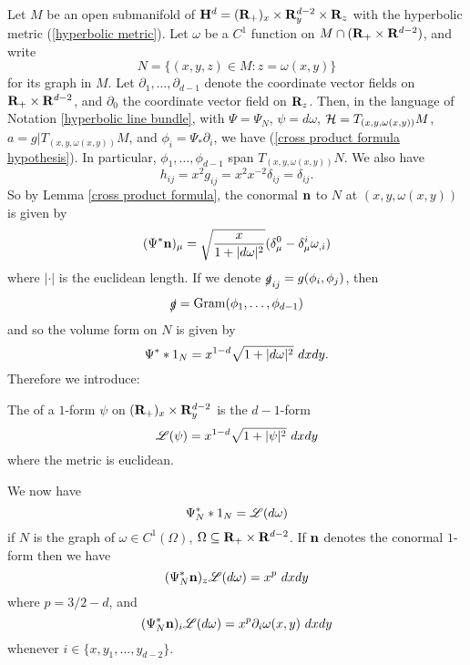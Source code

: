 Let $M$ be an open submanifold of $\mathbf H^d = (\mathbf{R}_+)_x \times \mathbf{R}^{d - 2}_y \times \mathbf{R}_z$ with the hyperbolic metric (\ref{hyperbolic metric}).
Let $\omega$ be a $C^1$ function on $M \cap (\mathbf{R}_+ \times \mathbf{R}^{d - 2})$, and write
$$N = \{(x, y, z) \in M: z = \omega(x, y)\}$$
for its graph in $M$.
Let $\partial_1, \dots, \partial_{d - 1}$ denote the coordinate vector fields on $\mathbf{R}_+ \times \mathbf{R}^{d - 2}$, and $\partial_0$ the coordinate vector field on $\mathbf{R}_z$.
Then, in the language of Notation \ref{hyperbolic line bundle}, with $\Psi = \Psi_N$, $\psi = d\omega$, $\mathcal H = T_{(x, y, \omega(x, y))} M$, $a = g|T_{(x, y, \omega(x, y))} M$, and $\phi_i = \Psi_* \partial_i$, we have (\ref{cross product formula hypothesis}).
In particular, $\phi_1, \dots, \phi_{d - 1}$ span $T_{(x, y, \omega(x, y))}N$.
We also have
$$h_{ij} = x^2 g_{ij} = x^2 x^{-2} \delta_{ij} = \delta_{ij}.$$
So by Lemma \ref{cross product formula}, the conormal $\mathbf n$ to $N$ at $(x, y, \omega(x, y))$ is given by
$$(\Psi^* \mathbf n)_\mu = \sqrt{\frac{x}{1 + |d\omega|^2}} (\delta_\mu^0 - \delta_\mu^i \omega_{,i})$$
where $|\cdot|$ is the euclidean length.
If we denote $\slashed g_{ij} = g(\phi_i, \phi_j)$, then
$$\slashed g = \operatorname{Gram}(\phi_1, \dots, \phi_{d - 1})$$
and so the volume form on $N$ is given by
$$\Psi^* *1_N = x^{1 - d} \sqrt{1 + |d\omega|^2} ~dx dy.$$
Therefore we introduce:

\begin{definition}
    The  of a $1$-form $\psi$ on $(\mathbf{R}_+)_x \times \mathbf{R}^{d - 2}_y$ is the $d-1$-form
    $$\mathscr L(\psi) = x^{1 - d} \sqrt{1 + |\psi|^2} ~dxdy$$
    where the metric is euclidean.
\end{definition}

We now have
\begin{equation}\label{Lagrangian formula}
    \Psi_N^* *1_N = \mathscr L(d\omega)
\end{equation}
if $N$ is the graph of $\omega \in C^1(\Omega)$, $\Omega \subseteq \mathbf{R}_+ \times \mathbf{R}^{d - 2}$.
If $\mathbf n$ denotes the conormal $1$-form then we have
\begin{equation}\label{Lagrangian normal z}
(\Psi^*_N \mathbf n)_z \mathscr L(d\omega) = x^p ~dxdy
\end{equation}
where $p = 3/2 - d$, and
\begin{equation}\label{Lagrangian normal xy}
(\Psi^*_N \mathbf n)_i \mathscr L(d\omega) = x^p \partial_i \omega(x, y) ~dxdy
\end{equation}
whenever $i \in \{x, y_1, \dots, y_{d - 2}\}$.

